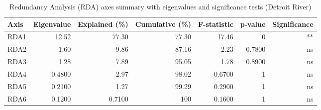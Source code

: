 \begin{table}[htbp]
  \centering
  \caption{Redundancy Analysis (RDA) axes summary with eigenvalues and significance tests (Detroit River)}
  \label{tab:dr_RDA_analysis_rda_axes_summary}
  \small
  \begin{tabular}{lrrrrrr}
    \toprule
    Axis & Eigenvalue & Explained (\%) & Cumulative (\%) & F-statistic & p-value & Significance \\
    \midrule
    RDA1 & 12.52 & 77.30 & 77.30 & 17.46 & 0 & ** \\
    RDA2 & 1.60 & 9.86 & 87.16 & 2.23 & 0.7800 & ns \\
    RDA3 & 1.28 & 7.89 & 95.05 & 1.78 & 0.8900 & ns \\
    RDA4 & 0.4800 & 2.97 & 98.02 & 0.6700 & 1 & ns \\
    RDA5 & 0.2100 & 1.27 & 99.29 & 0.2900 & 1 & ns \\
    RDA6 & 0.1200 & 0.7100 & 100 & 0.1600 & 1 & ns \\
    \bottomrule
  \end{tabular}
\end{table}

